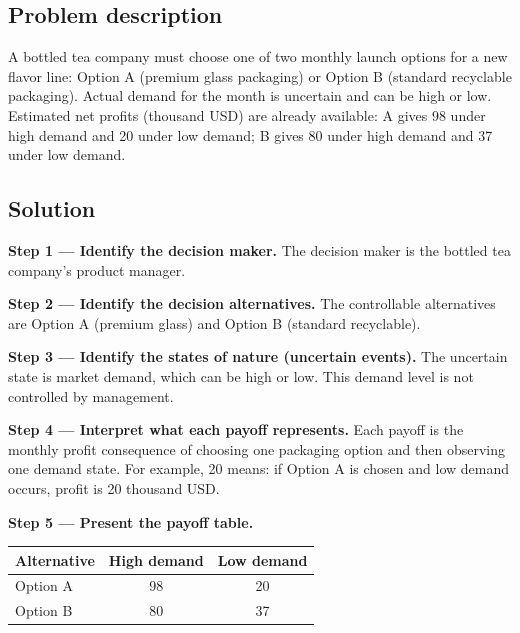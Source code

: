 

	
	\begin{ExamProblems}
		\item
		\subsection*{Problem description}
		A bottled tea company must choose one of two monthly launch options for a new flavor line:
		Option A (premium glass packaging) or Option B (standard recyclable packaging).
		Actual demand for the month is uncertain and can be high or low.
		Estimated net profits (thousand USD) are already available:
		A gives 98 under high demand and 20 under low demand;
		B gives 80 under high demand and 37 under low demand.
		
		\subsection*{Solution}
		\textbf{Step 1 --- Identify the decision maker.} The decision maker is the bottled tea company's product manager.
		
		\textbf{Step 2 --- Identify the decision alternatives.} The controllable alternatives are Option A (premium glass) and Option B (standard recyclable).
		
		\textbf{Step 3 --- Identify the states of nature (uncertain events).} The uncertain state is market demand, which can be high or low. This demand level is not controlled by management.
		
		\textbf{Step 4 --- Interpret what each payoff represents.} Each payoff is the monthly profit consequence of choosing one packaging option and then observing one demand state. For example, 20 means: if Option A is chosen and low demand occurs, profit is 20 thousand USD.
		
		\textbf{Step 5 --- Present the payoff table.}
		\begin{center}
			\begin{tabular}{l c c}
				\toprule
				Alternative & High demand & Low demand \\
				\midrule
				Option A & 98 & 20 \\
				Option B & 80 & 37 \\
				\bottomrule
			\end{tabular}
		\end{center}
		

\end{ExamProblems}
